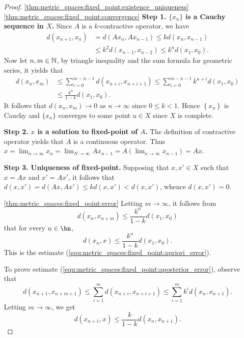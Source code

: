 \begin{proof}
\ref{thm:metric_spaces:fixed_point:existence_uniqueness}
\ref{thm:metric_spaces:fixed_point:convergence}
\textbf{Step 1. $\{x_n\}$ is a Cauchy sequence in $X$.}
Since $A$ is a $k$-contractive operator, we have 
\begin{equation*}
    \begin{aligned}
        d(x_{n+1}, x_n) &= d(Ax_n, Ax_{n-1}) 
        \le k d(x_n, x_{n-1}) \\ 
        &\le k^2 d(x_{n-1}, x_{n-2}) 
        \le k^n d(x_1, x_0). 
    \end{aligned}
\end{equation*}
Now let $n, m \in \mathbb{N}$, by triangle inequality and the sum formula for 
geometric series, it yields that 
\begin{equation*}
    \begin{aligned}
        d(x_n, x_m) &\le \sum_{i=0}^{m-n-1} d(x_{n+i}, x_{n+i+1}) 
        \le \sum_{i=0}^{m-n-1} k^{n+i} d(x_1, x_0) \\ 
        &\le \frac{k^n}{1-k} d(x_1, x_0). 
    \end{aligned}
\end{equation*}
It follows that $d(x_n, x_m) \to 0$ as $n \to \infty$ since $0 \le k < 1$. 
Hence $\left\{ x_n\right\}$ is Cauchy and $\{x_n\}$ converges to some point 
$u \in X$ since $X$ is complete. 

\textbf{Step 2. $x$ is a solution to fixed-point of $A$. }
The definition of contractive operator yields that $A$ is a continuous 
operator. 
Thus $x = \lim_{n \to \infty} x_n = \lim_{N \to \infty} Ax_{n-1} = A\left( 
\lim_{n \to \infty} x_{n-1} \right) = Ax$. 

\textbf{Step 3. Uniqueness of fixed-point. }
Supposing that $x, x' \in X$ such that $x = Ax$ and $x' = Ax'$, it follows 
that $d(x, x') = d(Ax, Ax') \le kd(x, x') < d(x, x')$, whence 
$d(x, x') = 0$. 

\ref{thm:metric_spaces:fixed_point:error} 
Letting $m \to \infty$, it follows from 
\begin{equation*}
    d(x_n, x_{n+m}) \le \frac{k^n}{1 - k} d(x_1, x_0)
\end{equation*}
that for every $n \in \bn$, 
\begin{equation*}
    d(x_n, x) \le \frac{k^n}{1 - k} d(x_1, x_0). 
\end{equation*}
This is the estimate (\ref{equ:metric_spaces:fixed_point:apriori_error}).

To prove estimate (\ref{equ:metric_spaces:fixed_point:aposterior_error}), 
observe that 
\begin{equation*}
    d(x_{n+1}, x_{n+m+1}) \le \sum_{i=1}^{m} d(x_{n+i}, x_{n+i+1}) 
    \le \sum_{i=1}^{m} k^{i} d(x_{n}, x_{n+1}). 
\end{equation*}
Letting $m \to \infty$, we get 
\begin{equation*}
    d(x_{n+1}, x) \le \frac{k}{1-k} d(x_n, x_{n+1}).  
\end{equation*}


\end{proof}
